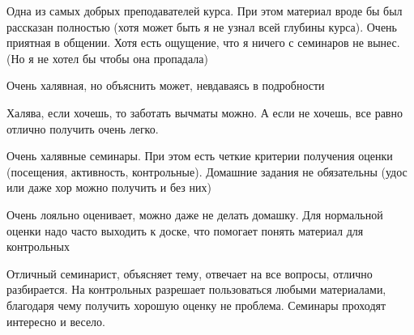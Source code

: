             \begin{commentbox} 
                Одна из самых добрых преподавателей курса. При этом материал вроде бы был рассказан полностью (хотя может быть я не узнал всей глубины курса). Очень приятная в общении. Хотя есть ощущение, что я ничего с семинаров не вынес. (Но я не хотел бы чтобы она пропадала) 
            \end{commentbox} 

            \begin{commentbox} 
                Очень халявная, но объяснить может, невдаваясь в подробности 
            \end{commentbox} 

            \begin{commentbox} 
                Халява, если хочешь, то заботать вычматы можно. А если не хочешь, все равно отлично получить очень легко. 
            \end{commentbox} 

            \begin{commentbox} 
                Очень халявные семинары. При этом есть четкие критерии получения оценки (посещения, активность, контрольные). Домашние задания не обязательны (удос или даже хор можно получить и без них) 
            \end{commentbox} 

            \begin{commentbox} 
                Очень лояльно оценивает, можно даже не делать домашку. Для нормальной оценки надо часто выходить к доске, что помогает понять материал для контрольных 
            \end{commentbox} 

            \begin{commentbox} 
                Отличный семинарист, объясняет тему, отвечает на все вопросы, отлично разбирается. На контрольных разрешает пользоваться любыми материалами, благодаря чему получить хорошую оценку не проблема. Семинары проходят интересно и весело. 
            \end{commentbox}


